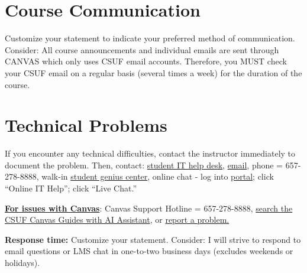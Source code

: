 \documentclass[12pt]{article} %
\begin{document}

\section*{Course Communication}

{\color{annotationblue}Customize your statement to indicate your preferred method of communication.} {\color{suggestionred}Consider: All course announcements and individual emails are sent through CANVAS which only uses CSUF email accounts. Therefore, you MUST check your CSUF email on a regular basis (several times a week) for the duration of the course.}

\section*{Technical Problems}

{\color{suggestionred}If you encounter any technical difficulties, contact the instructor immediately to document the problem. Then, contact: \href{https://www.fullerton.edu/it/services/helpdesk/}{student IT help desk}, \href{mailto:StudentITHelpDesk@fullerton.edu}{email}, phone = 657-278-8888, walk-in \href{http://www.fullerton.edu/it/students/sgc/index.php}{student genius center}, online chat - log into \href{http://my.fullerton.edu}{portal}; click ``Online IT Help''; click ``Live Chat.''}

\vspace{0.5em}

\noindent \textbf{\underline{For issues with Canvas}}: {\color{suggestionred}Canvas Support Hotline = 657-278-8888, \href{https://canvashelp.fullerton.edu/}{search the CSUF Canvas Guides with AI Assistant}, or \href{https://titans.service-now.com/sp?id=sc_cat_item&sys_id=f88efe80ebea6a10fb7cfcffcad0cdc6&subject=Canvas}{report a problem.}}


\vspace{0.5em}

\noindent \textbf{Response time:} {\color{annotationblue}Customize your statement.} {\color{suggestionred}Consider: I will strive to respond to email questions or LMS chat in one-to-two business days (excludes weekends or holidays).}
\end{document}
